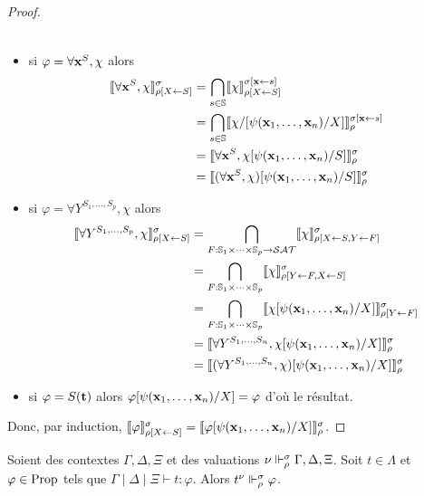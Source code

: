 \documentclass{article}
\begin{document}
\begin{proof}
\begin{itemize}
\begin{align*}
    \end{align*}
  \item si $\varphi = \forall \mathbf{x}^S, \chi$ alors
    \begin{align*}
      \llbracket \forall \mathbf{x}^S, \chi \rrbracket_{\rho[X\leftarrow S]}^\sigma &= \bigcap_{s\in\mathbb{S}}\llbracket \chi \rrbracket_{\rho[X\leftarrow S]}^{\sigma[\mathbf{x}\leftarrow s]}\\
      &= \bigcap_{s\in\mathbb{S}}\llbracket \chi/[\psi(\mathbf{x}_1,\ldots,\mathbf{x}_n)/X] \rrbracket_\rho^{\sigma[\mathbf{x}\leftarrow s]}\\
      &= \llbracket \forall \mathbf{x}^S, \chi[\psi(\mathbf{x}_1,\ldots,\mathbf{x}_n)/S] \rrbracket_\rho^\sigma\\
      &= \llbracket (\forall \mathbf{x}^S, \chi)[\psi(\mathbf{x}_1,\ldots,\mathbf{x}_n)/S] \rrbracket_\rho^\sigma
    \end{align*}
  \item si $\varphi = \forall Y^{S_1,\ldots,S_p},\chi$ alors
    \begin{align*}
      \llbracket \forall Y^{S_1,\ldots,S_p}, \chi \rrbracket_{\rho[X\leftarrow S]}^\sigma &= \bigcap_{F : \mathbb{S}_1\times\cdots\times\mathbb{S}_p \to \mathcal {SAT}}\llbracket \chi \rrbracket_{\rho[X\leftarrow S, Y\leftarrow F]}^\sigma\\
      &= \bigcap_{F : \mathbb{S}_1\times\cdots\times\mathbb{S}_p}\llbracket \chi \rrbracket_{\rho[Y\leftarrow F, X\leftarrow S]}^\sigma\\
      &= \bigcap_{F : \mathbb{S}_1\times\cdots\times\mathbb{S}_p}\llbracket \chi[\psi(\mathbf{x}_1,\ldots,\mathbf{x}_n)/X] \rrbracket_{\rho[Y\leftarrow F]}^\sigma\\
      &= \llbracket \forall Y^{S_1,\ldots,S_n}, \chi[\psi(\mathbf{x}_1,\ldots,\mathbf{x}_n)/X] \rrbracket_\rho^\sigma\\
      &= \llbracket (\forall Y^{S_1,\ldots,S_n}, \chi)[\psi(\mathbf{x}_1,\ldots,\mathbf{x}_n)/X] \rrbracket_\rho^\sigma
    \end{align*}
  \item si $\varphi = S(\mathbf{t})$ alors $\varphi[\psi(\mathbf{x}_1,\ldots,\mathbf{x}_n)/X] = \varphi$ d'où le résultat.
  \end{itemize}
  Donc, par induction, $\llbracket \varphi \rrbracket_{\rho[X\leftarrow S]}^\sigma = \llbracket \varphi[\psi(\mathbf{x}_1,\ldots,\mathbf{x}_n)/X] \rrbracket_\rho^\sigma$.
\end{proof}

\begin{lem}[Adéquation]
  Soient des contextes $\Gamma,\Delta,\Xi$ et des valuations $\nu\Vdash_\rho^\sigma \Gamma,\Delta,\Xi$. Soit $t\in\Lambda$ et $\varphi\in\mathrm{Prop}$ tels que $\Gamma\mid\Delta\mid\Xi\vdash t : \varphi$. Alors $t^\nu \Vdash_\rho^\sigma \varphi$.
\end{lem}
\end{document}
